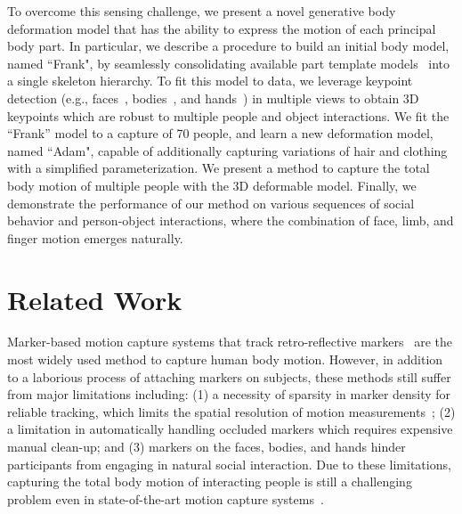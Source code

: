 To overcome this sensing challenge, we present a novel generative body deformation model that has the ability to express the motion of each principal body part. In particular, we describe a procedure to build an initial body model, named ``Frank", by seamlessly consolidating available part template models~\cite{Loper2015,cao2014facewarehouse} into a single skeleton hierarchy. To fit this model to data, we leverage keypoint detection (e.g., faces~\cite{Torre15}, bodies~\cite{Wei2016,cao2017realtime,Newell-16}, and hands~\cite{simon2017hand}) in multiple views to obtain 3D keypoints which are robust to multiple people and object interactions. We fit the ``Frank'' model to a capture of 70 people, and learn a new deformation model, named ``Adam", capable of additionally capturing variations of hair and clothing with a simplified parameterization. We present a method to capture the total body motion of multiple people with the 3D deformable model. Finally, we demonstrate the performance of our method on various sequences of social behavior and person-object interactions, where the combination of face, limb, and finger motion emerges naturally.

\section{Related Work}

Marker-based motion capture systems that track retro-reflective markers~\cite{VICON, woltring1973new} are the most widely used method to capture human body motion. However, in addition to a laborious process of attaching markers on subjects, these methods still suffer from major limitations including: (1) a necessity of sparsity in marker density for reliable tracking, which limits the spatial resolution of motion measurements~\cite{park2006capturing}; (2) a limitation in automatically handling occluded markers which requires expensive manual clean-up; and (3) markers on the faces, bodies, and hands hinder participants from engaging in natural social interaction. Due to these limitations, capturing the total body motion of interacting people is still a challenging problem even in state-of-the-art motion capture systems~\cite{VICON}. 

